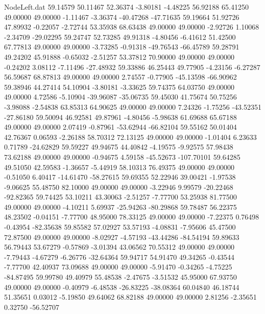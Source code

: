 \begin{filecontents}{NodeLeft.dat}
  59.14579   50.11467   52.36374    -3.80181   -4.48225   56.92188   65.41250   49.00000   49.00000   -1.11467   -3.36374  -40.47268  -47.71635
  59.19664   51.92726   47.89932    -0.22057   -2.72744   53.35938   68.63438   49.00000   49.00000   -2.92726    1.10068   -2.34709  -29.02295
  59.24747   52.73285   49.91318    -4.80456   -6.41612   51.42500   67.77813   49.00000   49.00000   -3.73285   -0.91318  -49.76543  -66.45789
  59.28791   49.24202   45.91888    -0.65032   -2.51257   53.37812   70.90000   49.00000   49.00000   -0.24202    3.08112   -7.11496  -27.48932
  59.33886   46.25443   49.77905    -4.23156   -6.27287   56.59687   68.87813   49.00000   49.00000    2.74557   -0.77905  -45.13598  -66.90962
  59.38946   44.27414   54.10904    -3.80181   -3.33625   59.74375   64.03750   49.00000   49.00000    4.72586   -5.10904  -39.96087  -35.06735
  59.45030   41.75674   50.75256    -3.98088   -2.54838   63.85313   64.90625   49.00000   49.00000    7.24326   -1.75256  -43.52351  -27.86180
  59.50094   46.92581   49.87961    -4.80456   -5.98638   61.69688   65.67188   49.00000   49.00000    2.07419   -0.87961  -53.62944  -66.82104
  59.55162   50.01404   42.76367     0.06593   -2.26188   58.70312   72.13125   49.00000   49.00000   -1.01404    6.23633    0.71789  -24.62829
  59.59227   49.94675   44.40842    -4.19575   -9.92575   57.98438   73.62188   49.00000   49.00000   -0.94675    4.59158  -45.52673 -107.70101
  59.64285   49.51050   42.59583    -1.36657   -5.44919   58.10313   76.49375   49.00000   49.00000   -0.51050    6.40417  -14.61470  -58.27615
  59.69355   52.22946   39.00421    -1.97538   -9.06625   55.48750   82.10000   49.00000   49.00000   -3.22946    9.99579  -20.22468  -92.82365
  59.74425   53.10211   43.30063    -2.51257   -7.77700   53.25938   81.77500   49.00000   49.00000   -4.10211    5.69937  -25.94263  -80.29868
  59.78487   56.22375   48.23502    -0.04151   -7.77700   48.95000   78.33125   49.00000   49.00000   -7.22375    0.76498   -0.43954  -82.35638
  59.85582   57.02927   53.57193    -4.08831   -7.95606   45.47500   72.87500   49.00000   49.00000   -8.02927   -4.57193  -43.44286  -84.54194
  59.89633   56.79443   53.67279    -0.57869   -3.01394   43.06562   70.55312   49.00000   49.00000   -7.79443   -4.67279   -6.26776  -32.64364
  59.94717   54.91470   49.34265    -0.43544   -7.77700   42.40937   73.09688   49.00000   49.00000   -5.91470   -0.34265   -4.75225  -84.87495
  59.99780   49.40979   55.48538    -2.47675   -3.51532   45.95000   67.93750   49.00000   49.00000   -0.40979   -6.48538  -26.83225  -38.08364
  60.04840   46.18744   51.35651     0.03012   -5.19850   49.64062   68.82188   49.00000   49.00000    2.81256   -2.35651    0.32750  -56.52707

\end{filecontents}
